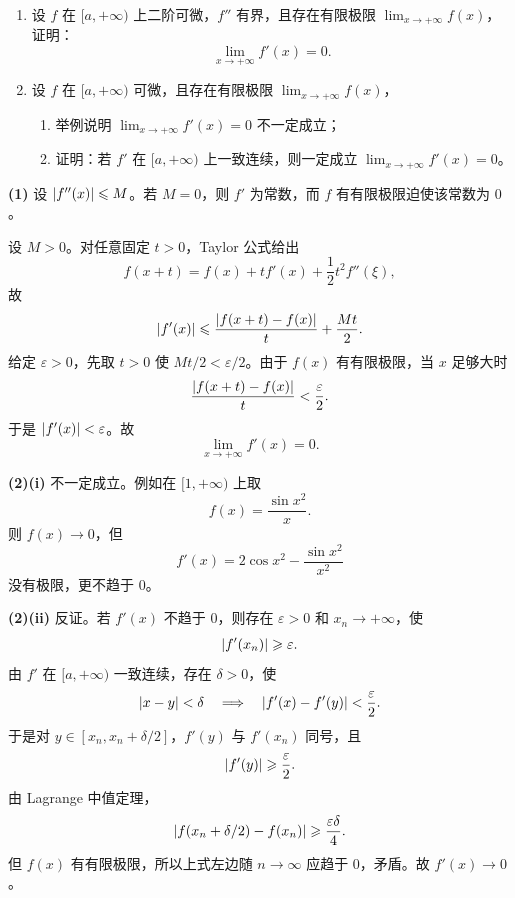 \begin{xreferenceproblem}[17]
\begin{enumerate}[label=(\arabic*)]
  \item 设 $f$ 在 $[a,+\infty)$ 上二阶可微，$f''$ 有界，且存在有限极限 $\lim_{x\to+\infty}f(x)$，证明：
  \[
    \lim_{x\to+\infty}f'(x)=0.
  \]
  \item 设 $f$ 在 $[a,+\infty)$ 可微，且存在有限极限 $\lim_{x\to+\infty}f(x)$，
  \begin{enumerate}[label=(\roman*)]
    \item 举例说明 $\lim_{x\to+\infty}f'(x)=0$ 不一定成立；
    \item 证明：若 $f'$ 在 $[a,+\infty)$ 上一致连续，则一定成立 $\lim_{x\to+\infty}f'(x)=0$。
  \end{enumerate}
\end{enumerate}
\end{xreferenceproblem}
\begin{xsolution}
\textbf{(1)}\quad
设 $\lvert f''(x)\rvert\leqslant M$。若 $M=0$，则 $f'$ 为常数，而 $f$ 有有限极限迫使该常数为 $0$。

设 $M>0$。对任意固定 $t>0$，Taylor 公式给出
\[
  f(x+t)=f(x)+tf'(x)+\frac12t^2f''(\xi),
\]
故
\[
  \lvert f'(x)\rvert
  \leqslant\frac{\lvert f(x+t)-f(x)\rvert}t+\frac{Mt}{2}.
\]
给定 $\varepsilon>0$，先取 $t>0$ 使 $Mt/2<\varepsilon/2$。由于 $f(x)$ 有有限极限，当 $x$ 足够大时
\[
  \frac{\lvert f(x+t)-f(x)\rvert}t<\frac\varepsilon2.
\]
于是 $\lvert f'(x)\rvert<\varepsilon$。故
\[
  \lim_{x\to+\infty}f'(x)=0.
\]

\textbf{(2)(i)}\quad
不一定成立。例如在 $[1,+\infty)$ 上取
\[
  f(x)=\frac{\sin x^2}{x}.
\]
则 $f(x)\to0$，但
\[
  f'(x)=2\cos x^2-\frac{\sin x^2}{x^2}
\]
没有极限，更不趋于 $0$。

\textbf{(2)(ii)}\quad
反证。若 $f'(x)$ 不趋于 $0$，则存在 $\varepsilon>0$ 和 $x_n\to+\infty$，使
\[
  \lvert f'(x_n)\rvert\geqslant\varepsilon.
\]
由 $f'$ 在 $[a,+\infty)$ 一致连续，存在 $\delta>0$，使
\[
  \lvert x-y\rvert<\delta
  \quad\Longrightarrow\quad
  \lvert f'(x)-f'(y)\rvert<\frac\varepsilon2.
\]
于是对 $y\in[x_n,x_n+\delta/2]$，$f'(y)$ 与 $f'(x_n)$ 同号，且
\[
  \lvert f'(y)\rvert\geqslant\frac\varepsilon2.
\]
由 Lagrange 中值定理，
\[
  \lvert f(x_n+\delta/2)-f(x_n)\rvert
  \geqslant\frac{\varepsilon\delta}{4}.
\]
但 $f(x)$ 有有限极限，所以上式左边随 $n\to\infty$ 应趋于 $0$，矛盾。故 $f'(x)\to0$。
\end{xsolution}



